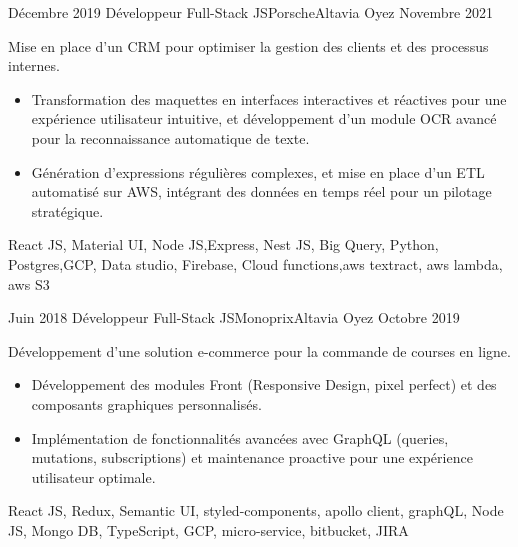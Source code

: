 \begin{experiences}
  \emptySeparator   
  \experience
  {Décembre 2019}  {Développeur Full-Stack JS}{Porsche}{Altavia Oyez}
  {Novembre 2021}   {
                      Mise en place d’un CRM pour optimiser la gestion des clients et des processus internes.
                      \begin{itemize}


                    \item  Transformation des maquettes en interfaces interactives et réactives pour une expérience utilisateur intuitive, et développement d’un module OCR avancé pour la reconnaissance automatique de texte.
                    \item Génération d'expressions régulières complexes, et mise en place d’un ETL automatisé sur AWS, intégrant des données en temps réel pour un pilotage stratégique.
                      \end{itemize}
                  }
                  {React JS, Material UI, Node JS,Express, Nest JS, Big Query, Python, Postgres,GCP, Data studio, Firebase, Cloud functions,aws textract, aws lambda, aws S3}  
                
  \emptySeparator   
  \experience
  {Juin 2018}  {Développeur Full-Stack JS}{Monoprix}{Altavia Oyez}
  {Octobre 2019}   {
                      Développement d’une solution e-commerce pour la commande de courses en ligne.
                      \begin{itemize}
                      

                        \item Développement des modules Front (Responsive Design, pixel perfect) et des composants graphiques personnalisés.
                        \item Implémentation de fonctionnalités avancées avec GraphQL (queries, mutations, subscriptions) et maintenance proactive pour une expérience utilisateur optimale.

                      \end{itemize}
                  }
                  {React JS, Redux, Semantic UI, styled-components, apollo client, graphQL, Node JS, Mongo DB, TypeScript, GCP, micro-service, bitbucket, JIRA }  
                
  
\end{experiences}
